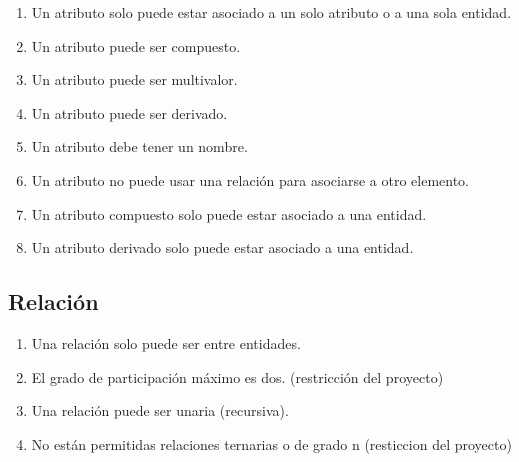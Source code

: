 \begin{enumerate}    
\item Un atributo solo puede estar asociado a un solo atributo o a una sola entidad.
\item Un atributo puede ser compuesto.
\item Un atributo puede ser multivalor.
\item Un atributo puede ser derivado.
\item Un atributo debe tener un nombre.
\item Un atributo no puede usar una relación para asociarse a otro elemento.
\item Un atributo compuesto solo puede estar asociado a una entidad.
\item Un atributo derivado solo puede estar asociado a una entidad.
\end{enumerate}

\subsection{Relación}

\begin{enumerate}
    \item Una relación solo puede ser entre entidades.
    \item El grado de participación máximo es dos. (restricción del proyecto)
    \item Una relación puede ser unaria (recursiva).
    \item No están permitidas relaciones ternarias o de grado n (resticcion del proyecto)
\end{enumerate}